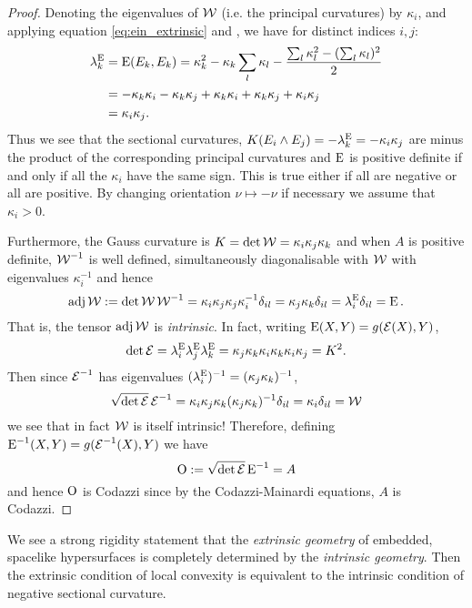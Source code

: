 \documentclass[a4paper, 12pt]{amsart}
\begin{document}
\begin{proof}
Denoting the eigenvalues of \(\operatorname{\mathcal{W}}\) (i.e. the principal curvatures) by \(\kappa_i\), and applying equation \eqref{eq:ein_extrinsic} and , we have for distinct indices \(i,j\):
\[
\begin{split}
\lambda^{\operatorname{E}}_k &= \operatorname{E}(E_k, E_k) = \kappa_k^2 - \kappa_k \sum_l \kappa_l - \frac{\sum_l \kappa_l^2 - (\sum_l \kappa_l)^2}{2} \\
&= - \kappa_k \kappa_i - \kappa_k \kappa_j + \kappa_k \kappa_i + \kappa_k \kappa_j + \kappa_i \kappa_j \\
&= \kappa_i \kappa_j.
\end{split}
\]
Thus we see that the sectional curvatures, \(K(E_i \wedge E_j) = - \lambda^{\operatorname{E}}_k = -\kappa_i\kappa_j\) are minus the product of the corresponding principal curvatures and \(\operatorname{E}\) is positive definite if and only if all the \(\kappa_i\) have the same sign. This is true either if all are negative or all are positive. By changing orientation \(\nu \mapsto -\nu\) if necessary we assume that \(\kappa_i > 0\).

Furthermore, the Gauss curvature is \(K = \det \operatorname{\mathcal{W}} = \kappa_i \kappa_j \kappa_k\) and when \(A\) is positive definite, \(\operatorname{\mathcal{W}}^{-1}\) is well defined, simultaneously diagonalisable with \(\operatorname{\mathcal{W}}\) with eigenvalues \(\kappa_i^{-1}\) and hence
\[
\operatorname{adj} \operatorname{\mathcal{W}} := \det \operatorname{\mathcal{W}} \operatorname{\mathcal{W}}^{-1} = \kappa_i \kappa_j \kappa_j \kappa_i^{-1} \delta_{il} = \kappa_j \kappa_k \delta_{il} = \lambda^{\operatorname{E}}_i \delta_{il} = \operatorname{E}.
\]
That is, the tensor \(\operatorname{adj} \operatorname{\mathcal{W}}\) is \emph{intrinsic}. In fact, writing \(\operatorname{E}(X, Y) = g(\operatorname{\mathcal{E}} (X), Y)\),
\[
\det \operatorname{\mathcal{E}} = \lambda^{\operatorname{E}}_i \lambda^{\operatorname{E}}_j \lambda^{\operatorname{E}}_k = \kappa_j \kappa_k \kappa_i \kappa_k \kappa_i \kappa_j = K^2.
\]
Then since \(\operatorname{\mathcal{E}}^{-1}\) has eigenvalues \((\lambda_i^{\operatorname{E}})^{-1} = (\kappa_j \kappa_k)^{-1}\),
\[
\sqrt{\det \operatorname{\mathcal{E}}} \operatorname{\mathcal{E}}^{-1} = \kappa_i \kappa_j \kappa_k (\kappa_j \kappa_k)^{-1} \delta_{il} = \kappa_i \delta_{il} = \operatorname{\mathcal{W}}
\]
we see that in fact \(\operatorname{\mathcal{W}}\) is itself intrinsic! Therefore, defining \(\operatorname{E}^{-1}(X, Y) = g(\operatorname{\mathcal{E}}^{-1} (X), Y)\) we have
\[
\operatorname{O} := \sqrt{\det \operatorname{\mathcal{E}}} \operatorname{E}^{-1} = A
\]
and hence \(\operatorname{O}\) is Codazzi since by the Codazzi-Mainardi equations, \(A\) is Codazzi.
\end{proof}
\begin{rem}
We see a strong rigidity statement that the \emph{extrinsic geometry} of embedded, spacelike hypersurfaces is completely determined by the \emph{intrinsic geometry}. Then the extrinsic condition of local convexity is equivalent to the intrinsic condition of negative sectional curvature.
\end{rem}
\end{document}
